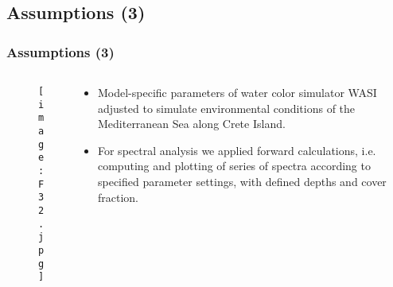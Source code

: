 \documentclass[pdflatex,compress,9pt,
	xcolor={dvipsnames,dvipsnames,svgnames,x11names,table},
	hyperref={colorlinks = true,breaklinks = true, urlcolor = NavyBlue, breaklinks = true}]{beamer}
\begin{document}
\subsection{Assumptions (3)}
\begin{frame}\frametitle{Assumptions (3)}
\begin{minipage}[0.4\textheight]{\textwidth}
\begin{columns}[T]
\begin{column}{0.5\textwidth}
\vspace{1em}
\begin{figure}[H]
	\centering
		\texttt{[image: F32.jpg]}
\end{figure}
\end{column}
\begin{column}{0.5\textwidth}
\vspace{1em} 
\begin{itemize}
	\item Model-specific parameters of water color simulator \ac{WASI} adjusted to simulate environmental conditions of the Mediterranean Sea along Crete Island. 
	\item For spectral analysis we applied forward calculations, i.e. computing and plotting of series of spectra according to specified parameter settings, with defined depths and cover fraction.
\end{itemize}
\end{column}
\end{columns}
\end{minipage}
\end{frame}
\end{document}
